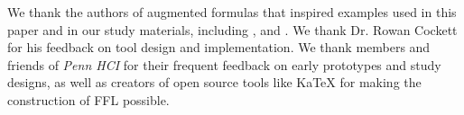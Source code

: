 We thank the authors of augmented formulas that inspired examples used in this paper and in our study materials, including \citet{mohammed2020continuous,ref:murad2020navierstokes,W4,ref:cockett2016pixels}, and \citet{ref:hohman2019gamut}.
We thank Dr. Rowan Cockett for his feedback on tool design and implementation. We thank members and friends of \emph{Penn HCI} for their frequent feedback on early prototypes and study designs, as well as creators of open source tools like KaTeX for making the construction of FFL possible.
